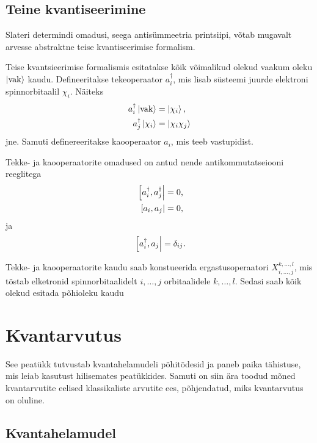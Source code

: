 \documentclass[12pt]{report}
\def\ket#1{\mathinner{|#1\rangle}}
\begin{document}
\section{Teine kvantiseerimine}\label{secquant}

Slateri determindi omadusi, seega antisümmeetria printsiipi, võtab mugavalt arvesse abstraktne teise kvantiseerimise formalism.

Teise kvantsieerimise formalismis esitatakse kõik võimalikud olekud vaakum oleku \(\ket{\mathrm{vak}}\) kaudu.
Defineeritakse tekeoperaator \(a_i^{\dagger}\), mis lisab süsteemi juurde elektroni spinnorbitaalil \(\chi_i\).
Näiteks
\begin{align}
    a_i^{\dagger}\ket{\mathrm{vak}} &= \ket{\chi_i}\rlap{,} \\
    a_j^{\dagger}\ket{\chi_i} & =\ket{\chi_i\chi_j}
\end{align}
jne.
Samuti definereeritakse kaooperaator \(a_i\), mis teeb vastupidist.

Tekke- ja kaooperaatorite omadused on antud nende antikommutatseiooni reeglitega
\begin{align}
    \left[a_i^{\dagger}, a_j^{\dagger}\right|&= 0\rlap{,} \\
    \left[a_i, a_j\right|&= 0\rlap{,}
\end{align}
ja
\begin{equation}
    \left[a_i^{\dagger}, a_j\right| = \delta_{ij}\rlap{.}
\end{equation}

Tekke- ja kaooperaatorite kaudu saab konstueerida ergastusoperaatori \(X_{i,\ldots, j}^{k,\ldots,l}\), mis tõstab elketronid spinnorbitaalidelt \(i,\ldots,j\) orbitaalidele \(k,\ldots, l\).
Sedasi saab kõik olekud esitada põhioleku kaudu~\cite{szabo+ostlnud}



\chapter{Kvantarvutus}

See peatükk tutvustab kvantahelamudeli põhitõdesid ja paneb paika tähistuse,
mis leiab kasutust hilisemates peatükkides. Samuti on siin ära toodud mõned
kvantarvutite eelised klassikaliste arvutite ees, põhjendatud, miks
kvantarvutus on oluline.


\section{Kvantahelamudel}
\end{document}

